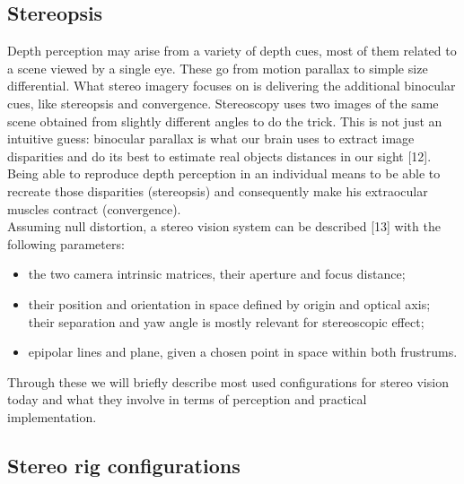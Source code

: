 \subsection{Stereopsis}
Depth perception may arise from a variety of depth cues, most of them related to a scene viewed by a single eye. These go from motion parallax to simple size differential. What stereo imagery focuses on is delivering the additional binocular cues, like stereopsis and convergence. Stereoscopy uses two images of the same scene obtained from slightly different angles to do the trick. This is not just an intuitive guess: binocular parallax is what our brain uses to extract image disparities and do its best to estimate real objects distances in our sight [12]. Being able to reproduce depth perception in an individual means to be able to recreate those disparities (stereopsis) and consequently make his extraocular muscles contract (convergence).\\
Assuming null distortion, a stereo vision system can be described [13] with the following parameters:
\begin{itemize}
\item the two camera intrinsic matrices, their aperture and focus distance;
\item their position and orientation in space defined by origin and optical axis; their separation and yaw angle is mostly relevant for stereoscopic effect;
\item epipolar lines and plane, given a chosen point in space within both frustrums.
\end{itemize}
Through these we will briefly describe most used configurations for stereo vision today and what they involve in terms of perception and practical implementation.

\subsection{Stereo rig configurations}

